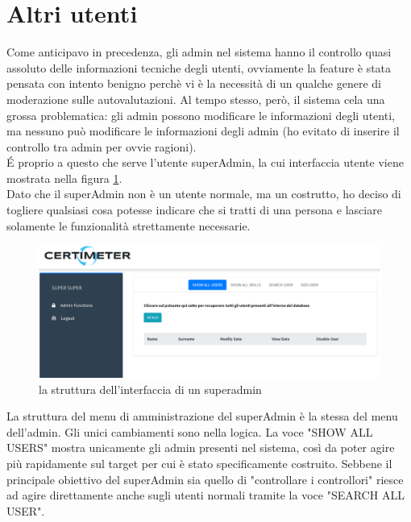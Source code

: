 \section{Altri utenti}
Come anticipavo in precedenza, gli admin nel sistema hanno il controllo quasi assoluto delle informazioni tecniche degli utenti, ovviamente la feature è stata pensata con intento benigno perchè vi è la necessità di un qualche genere di moderazione sulle autovalutazioni. Al tempo stesso, però, il sistema cela una grossa problematica: gli admin possono modificare le informazioni degli utenti, ma nessuno può modificare le informazioni degli admin (ho evitato di inserire il controllo tra admin per ovvie ragioni).
\\
\'E proprio a questo che serve l'utente superAdmin, la cui interfaccia utente viene mostrata nella figura \ref{fig:homepageSuperAdmin}.
\\
Dato che il superAdmin non è un utente normale, ma un costrutto, ho deciso di togliere qualsiasi cosa potesse indicare che si tratti di una persona e lasciare solamente le funzionalità strettamente necessarie.
\begin{figure}[h]
    \centering
    \includegraphics[width=450px]{./images/super_admin.png}
    \caption{la struttura dell'interfaccia di un superadmin}
    \label{fig:homepageSuperAdmin}
\end{figure}
La struttura del menu di amministrazione del superAdmin è la stessa del menu dell'admin. Gli unici cambiamenti sono nella logica. La voce "SHOW ALL USERS" mostra unicamente gli admin presenti nel sistema, così da poter agire più rapidamente sul target per cui è stato specificamente costruito. Sebbene il principale obiettivo del superAdmin sia quello di "controllare i controllori" riesce ad agire direttamente anche sugli utenti normali tramite la voce "SEARCH ALL USER".
